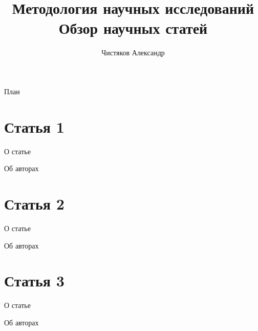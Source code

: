 \documentclass[11pt,pdf,hyperref=unicode,hyperref={bookmarks=false}]{beamer}
\author{Чистяков Александр}
\institute{группа 5126}
\title[Обзор научных статей]{Методология научных исследований\\ Обзор научных статей}
\begin{document}
  \begin{frame}
    \maketitle
  \end{frame}
  \begin{frame}{План}
    \tableofcontents
  \end{frame}
  \section{Статья 1}
    \begin{frame}{О статье}
    \end{frame}
    \begin{frame}{Об авторах}
    \end{frame}
  \section{Статья 2}
    \begin{frame}{О статье}
    \end{frame}
    \begin{frame}{Об авторах}
    \end{frame}
  \section{Статья 3}
    \begin{frame}{О статье}
    \end{frame}
    \begin{frame}{Об авторах}
    \end{frame}
\end{document}
